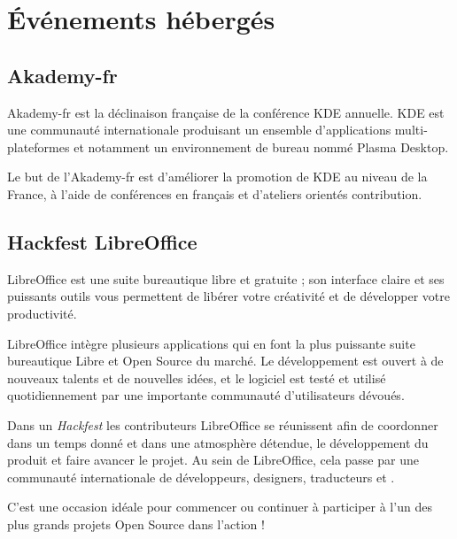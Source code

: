 \documentclass{cdl_sponsor}
\begin{document}
\section{Événements hébergés}

\subsection{Akademy-fr}

%
Akademy-fr est la déclinaison française de la conférence KDE annuelle. KDE est une communauté internationale produisant un ensemble d'applications multi-plateformes et notamment un environnement de bureau nommé Plasma Desktop.

\Separateur

Le but de l'Akademy-fr est d'améliorer la promotion de KDE au niveau de la France, à l'aide de conférences en français et d'ateliers orientés contribution.

\subsection{Hackfest LibreOffice}


LibreOffice est une suite bureautique libre et gratuite ; son interface claire et ses puissants outils vous permettent de libérer votre créativité et de développer votre productivité.

\Separateur

LibreOffice intègre plusieurs applications qui en font la plus puissante suite bureautique Libre et Open Source du marché. Le développement est ouvert à de nouveaux talents et de nouvelles idées, et le logiciel est testé et utilisé quotidiennement par une importante communauté d'utilisateurs dévoués.

\Separateur

Dans un \textit{Hackfest} les contributeurs LibreOffice se réunissent afin de coordonner dans un temps donné et dans une atmosphère détendue, le développement du produit et faire avancer le projet. Au sein de LibreOffice, cela passe par une communauté internationale de développeurs, designers, traducteurs et .

\Separateur 

C'est une occasion idéale pour commencer ou continuer à participer à l'un des plus grands projets Open Source dans l'action !
\end{document}
